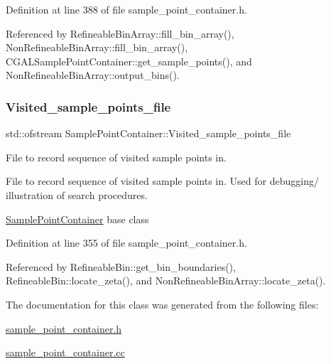 Definition at line 388 of file sample\+\_\+point\+\_\+container.\+h.



Referenced by Refineable\+Bin\+Array\+::fill\+\_\+bin\+\_\+array(), Non\+Refineable\+Bin\+Array\+::fill\+\_\+bin\+\_\+array(), C\+G\+A\+L\+Sample\+Point\+Container\+::get\+\_\+sample\+\_\+points(), and Non\+Refineable\+Bin\+Array\+::output\+\_\+bins().

\mbox{\label{classSamplePointContainer_ad08a1cb658b3783bcf7d8491e90965f3}} 
\subsubsection{\texorpdfstring{Visited\+\_\+sample\+\_\+points\+\_\+file}{Visited\_sample\_points\_file}}
{\footnotesize\ttfamily std\+::ofstream Sample\+Point\+Container\+::\+Visited\+\_\+sample\+\_\+points\+\_\+file\hspace{0.3cm}{\ttfamily [static]}}



File to record sequence of visited sample points in. 

File to record sequence of visited sample points in. Used for debugging/ illustration of search procedures.

\hyperlink{classSamplePointContainer}{Sample\+Point\+Container} base class 

Definition at line 355 of file sample\+\_\+point\+\_\+container.\+h.



Referenced by Refineable\+Bin\+::get\+\_\+bin\+\_\+boundaries(), Refineable\+Bin\+::locate\+\_\+zeta(), and Non\+Refineable\+Bin\+Array\+::locate\+\_\+zeta().



The documentation for this class was generated from the following files\+:\begin{DoxyCompactItemize}
\item 
\hyperlink{sample__point__container_8h}{sample\+\_\+point\+\_\+container.\+h}\item 
\hyperlink{sample__point__container_8cc}{sample\+\_\+point\+\_\+container.\+cc}\end{DoxyCompactItemize}
